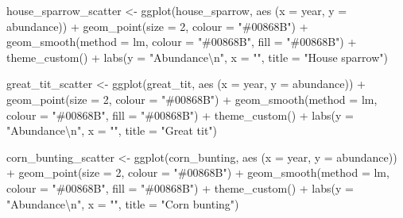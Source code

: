\documentclass[
]{book}
\newenvironment{Shaded}{\begin{snugshade}}{\end{snugshade}}
\newcommand{\AttributeTok}[1]{\textcolor[rgb]{0.77,0.63,0.00}{#1}}
\newcommand{\DecValTok}[1]{\textcolor[rgb]{0.00,0.00,0.81}{#1}}
\newcommand{\FunctionTok}[1]{\textcolor[rgb]{0.00,0.00,0.00}{#1}}
\newcommand{\NormalTok}[1]{#1}
\newcommand{\OtherTok}[1]{\textcolor[rgb]{0.56,0.35,0.01}{#1}}
\newcommand{\SpecialCharTok}[1]{\textcolor[rgb]{0.00,0.00,0.00}{#1}}
\newcommand{\StringTok}[1]{\textcolor[rgb]{0.31,0.60,0.02}{#1}}
\begin{document}
\begin{Shaded}
\begin{Highlighting}[]
\NormalTok{house\_sparrow\_scatter }\OtherTok{\textless{}{-}} \FunctionTok{ggplot}\NormalTok{(house\_sparrow, }\FunctionTok{aes}\NormalTok{ (}\AttributeTok{x =}\NormalTok{ year, }\AttributeTok{y =}\NormalTok{ abundance)) }\SpecialCharTok{+}
    \FunctionTok{geom\_point}\NormalTok{(}\AttributeTok{size =} \DecValTok{2}\NormalTok{, }\AttributeTok{colour =} \StringTok{"\#00868B"}\NormalTok{) }\SpecialCharTok{+}                                                
    \FunctionTok{geom\_smooth}\NormalTok{(}\AttributeTok{method =}\NormalTok{ lm, }\AttributeTok{colour =} \StringTok{"\#00868B"}\NormalTok{, }\AttributeTok{fill =} \StringTok{"\#00868B"}\NormalTok{) }\SpecialCharTok{+}          
    \FunctionTok{theme\_custom}\NormalTok{() }\SpecialCharTok{+}
    \FunctionTok{labs}\NormalTok{(}\AttributeTok{y =} \StringTok{"Abundance}\SpecialCharTok{\textbackslash{}n}\StringTok{"}\NormalTok{, }\AttributeTok{x =} \StringTok{""}\NormalTok{, }\AttributeTok{title =} \StringTok{"House sparrow"}\NormalTok{)}

\NormalTok{great\_tit\_scatter }\OtherTok{\textless{}{-}} \FunctionTok{ggplot}\NormalTok{(great\_tit, }\FunctionTok{aes}\NormalTok{ (}\AttributeTok{x =}\NormalTok{ year, }\AttributeTok{y =}\NormalTok{ abundance)) }\SpecialCharTok{+}
    \FunctionTok{geom\_point}\NormalTok{(}\AttributeTok{size =} \DecValTok{2}\NormalTok{, }\AttributeTok{colour =} \StringTok{"\#00868B"}\NormalTok{) }\SpecialCharTok{+}                                                
    \FunctionTok{geom\_smooth}\NormalTok{(}\AttributeTok{method =}\NormalTok{ lm, }\AttributeTok{colour =} \StringTok{"\#00868B"}\NormalTok{, }\AttributeTok{fill =} \StringTok{"\#00868B"}\NormalTok{) }\SpecialCharTok{+}          
    \FunctionTok{theme\_custom}\NormalTok{() }\SpecialCharTok{+}
    \FunctionTok{labs}\NormalTok{(}\AttributeTok{y =} \StringTok{"Abundance}\SpecialCharTok{\textbackslash{}n}\StringTok{"}\NormalTok{, }\AttributeTok{x =} \StringTok{""}\NormalTok{, }\AttributeTok{title =} \StringTok{"Great tit"}\NormalTok{)}

\NormalTok{corn\_bunting\_scatter }\OtherTok{\textless{}{-}} \FunctionTok{ggplot}\NormalTok{(corn\_bunting, }\FunctionTok{aes}\NormalTok{ (}\AttributeTok{x =}\NormalTok{ year, }\AttributeTok{y =}\NormalTok{ abundance)) }\SpecialCharTok{+}
    \FunctionTok{geom\_point}\NormalTok{(}\AttributeTok{size =} \DecValTok{2}\NormalTok{, }\AttributeTok{colour =} \StringTok{"\#00868B"}\NormalTok{) }\SpecialCharTok{+}                                                
    \FunctionTok{geom\_smooth}\NormalTok{(}\AttributeTok{method =}\NormalTok{ lm, }\AttributeTok{colour =} \StringTok{"\#00868B"}\NormalTok{, }\AttributeTok{fill =} \StringTok{"\#00868B"}\NormalTok{) }\SpecialCharTok{+}          
    \FunctionTok{theme\_custom}\NormalTok{() }\SpecialCharTok{+}
    \FunctionTok{labs}\NormalTok{(}\AttributeTok{y =} \StringTok{"Abundance}\SpecialCharTok{\textbackslash{}n}\StringTok{"}\NormalTok{, }\AttributeTok{x =} \StringTok{""}\NormalTok{, }\AttributeTok{title =} \StringTok{"Corn bunting"}\NormalTok{)}


\end{Highlighting}
\end{Shaded}
\end{document}
